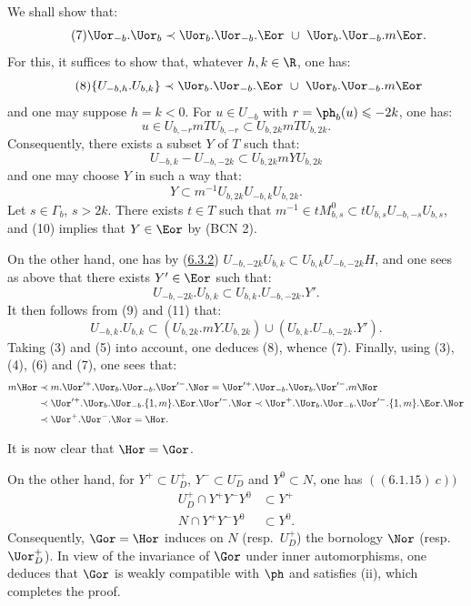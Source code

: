 \documentclass[12pt,a4paper,oneside,english]{smfart}
\makeatletter
\newcommand{\btpageanchor}[1]{\Hy@raisedlink{\hypertarget{p:#1}{}}}
\newcommand{\btref}[1]{\hyperlink{bt:#1}{#1}}
\newcommand{\btpage}[1]{\marginnote{p.~#1}\btpageanchor{#1}}
\newcommand{\pg}[1]{\btpage{#1}}
\theoremstyle{definition}
\theoremstyle{bt}
\makeatother
\begin{document}
We shall show that:
\begin{equation}\tag{7}
\Uor_{-b}.\Uor_b\prec\Uor_b.\Uor_{-b}.\Eor\ \cup\ \Uor_b.\Uor_{-b}.m\Eor .
\end{equation}
For this, it suffices to show that, whatever $h,k\in\R$, one has:
\begin{equation}\tag{8}
\{U_{-b,h}.U_{b,k}\}\prec\Uor_b.\Uor_{-b}.\Eor\ \cup\ \Uor_b.\Uor_{-b}.m\Eor
\end{equation}
and one may suppose $h=k<0$. For $u\in U_{-b}$ with $r=\ph_b(u)\leqslant-2k$, one has:
\[
u\in U_{b,-r}mTU_{b,-r}\subset U_{b,2k}mTU_{b,2k}.
\]
Consequently, there exists a subset $Y$ of $T$ such that:
\begin{equation}\tag{9}
U_{-b,k}-U_{-b,-2k}\subset U_{b,2k}mYU_{b,2k}
\end{equation}
and one may choose $Y$ in such a way that:
\begin{equation}\tag{10}
Y\subset m^{-1}U_{b,2k}U_{-b,k}U_{b,2k}.
\end{equation}
Let $s\in\Gamma_b$, $s>2k$. There exists $t\in T$ such that
$m^{-1}\in tM^0_{b,s}\subset tU_{b,s}U_{-b,-s}U_{b,s}$, and (10) implies that
$Y\in\Eor$ by (BCN 2).

\pg{190}
On the other hand, one has by (\btref{6.3.2})
$U_{-b,-2k}U_{b,k}\subset U_{b,k}U_{-b,-2k}H$, and one sees as above that there exists
$Y'\in\Eor$ such that:
\begin{equation}\tag{11}
U_{-b,-2k}.U_{b,k}\subset U_{b,k}.U_{-b,-2k}.Y' .
\end{equation}
It then follows from (9) and (11) that:
\[
U_{-b,k}.U_{b,k}\subset(U_{b,2k}.mY.U_{b,2k})\cup(U_{b,k}.U_{-b,-2k}.Y').
\]
Taking (3) and (5) into account, one deduces (8), whence (7). Finally, using (3), (4),
(6) and (7), one sees that:
\begin{align*}
m\Hor&\prec m.\Uor'^+.\Uor_b.\Uor_{-b}.\Uor'^-.\Nor
=\Uor'^+.\Uor_{-b}.\Uor_b.\Uor'^-.m\Nor\\
&\prec\Uor'^+.\Uor_b.\Uor_{-b}.\{1,m\}.\Eor.\Uor'^-.\Nor
\prec\Uor^+.\Uor_b.\Uor_{-b}.\Uor'^-.\{1,m\}.\Eor.\Nor\\
&\prec\Uor^+.\Uor^-.\Nor=\Hor .
\end{align*}

It is now clear that $\Hor=\Gor$.

On the other hand, for $Y^+\subset U^+_D$, $Y^-\subset U^-_D$ and $Y^0\subset N$, one
has $((6.1.15)\ c))$
\begin{align*}
U^+_D\cap Y^+Y^-Y^0&\subset Y^+\\
N\cap Y^+Y^-Y^0&\subset Y^0 .
\end{align*}
Consequently, $\Gor=\Hor$ induces on $N$ (resp.\ $U^+_D$) the bornology $\Nor$
(resp.\ $\Uor^+_D$). In view of the invariance of $\Gor$ under inner automorphisms, one
deduces that $\Gor$ is weakly compatible with $\ph$ and satisfies (ii), which completes
the proof.
\end{document}
